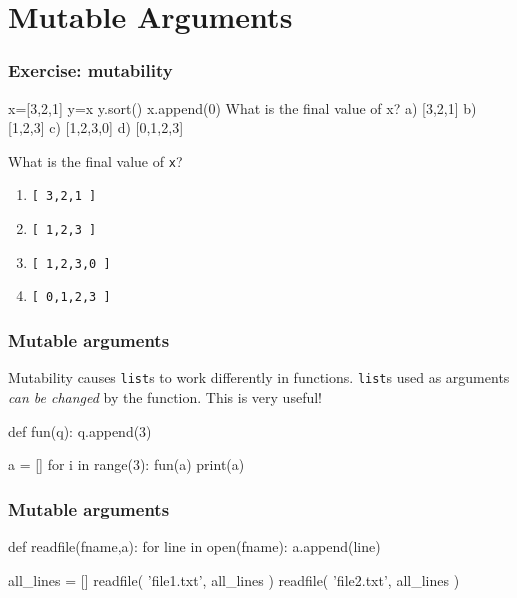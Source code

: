 \documentclass[11pt]{beamer}
\begin{document}
\section{Mutable Arguments}

\begin{frame}[fragile]
  \frametitle{Exercise:  mutability}
  \Enlarge

  \begin{semiverbatim}
x=[3,2,1]
y=x
y.sort()
x.append(0)
What is the final value of x?
a) [3,2,1]
b) [1,2,3]
c) [1,2,3,0]
d) [0,1,2,3]
  \end{semiverbatim}
  What is the final value of \texttt{x}?
  \begin{enumerate}[label=\Alph*]
  \item  \texttt{[ 3,2,1 ]}
  \item  \texttt{[ 1,2,3 ]}
  \item  \texttt{[ 1,2,3,0 ]}
  \item  \texttt{[ 0,1,2,3 ]}
  \end{enumerate}
\end{frame}

\begin{frame}[fragile]
  \frametitle{Mutable arguments}
  \Enlarge

  \begin{itemize}
  \myitem  Mutability causes \texttt{list}s to work differently in functions.
  \myitem  \texttt{list}s used as arguments \emph{can be changed} by the function.
  \myitem  This is very useful!
  \end{itemize}
  \begin{semiverbatim}
def fun(q):
    q.append(3)

a = []
for i in range(3):
    fun(a)
print(a)
  \end{semiverbatim}
\end{frame}

\begin{frame}[fragile]
  \frametitle{Mutable arguments}
  \Enlarge

  \begin{semiverbatim}
def readfile(fname,a):
    for line in open(fname):
        a.append(line)

all_lines = []
readfile( 'file1.txt', all_lines )
readfile( 'file2.txt', all_lines )
  \end{semiverbatim}
\end{frame}
\end{document}
